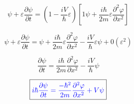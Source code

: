\documentclass{article}
\begin{document}
\begin{equation}
    \psi + \varepsilon  \frac{\partial \psi}{\partial t} = (1 - \frac{iV}{\hbar}\varepsilon) [1 \psi + \frac{i \hbar}{2m} \varepsilon \frac{\partial^2 \varphi}{\partial x^2} ]
\end{equation}

\begin{equation}
    \psi + \varepsilon  \frac{\partial \psi}{\partial t} = \psi + \frac{i \hbar}{2m} \varepsilon \frac{\partial^2 \varphi}{\partial x^2} - \frac{iV}{\hbar}\varepsilon \psi + 0(\varepsilon^2)
\end{equation}

\begin{equation}
    \frac{\partial \psi}{\partial t} = \frac{i \hbar}{2m} \frac{\partial^2 \varphi}{\partial x^2} - \frac{iV}{\hbar} \psi
\end{equation}

\[
\boxed{
\textcolor{blue}{
    i \hbar \frac{\partial \psi}{\partial t} =  \frac{- \hbar^2}{2m} \frac{\partial^2 \varphi}{\partial x^2} + V \psi
}
}
\]
\end{document}
